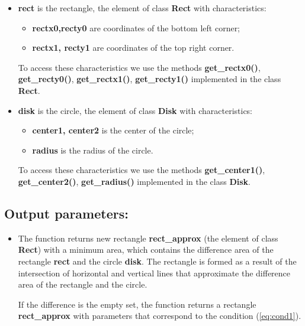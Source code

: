 \documentclass{report}
\begin{document}
\begin{itemize}
	\item {\bfseries	rect} is the rectangle, the element of class {\bfseries Rect} with characteristics:
	\begin{itemize}
		\item {\bfseries rectx0,recty0} are coordinates of the bottom left corner;
		\item {\bfseries rectx1, recty1} are coordinates of the top right corner.
	\end{itemize}
	
	To access these characteristics we use the methods  {\bfseries get\_rectx0()}, {\bfseries get\_recty0()}, {\bfseries get\_rectx1()}, {\bfseries get\_recty1()} implemented in the class {\bfseries Rect}.
	
	\item {\bfseries disk}  is the circle, the element of class {\bfseries Disk} with characteristics:
	\begin{itemize}
		\item {\bfseries center1, center2}  is the center of the circle;
		\item {\bfseries radius}  is  the radius of the circle.
	\end{itemize}
	
	To access these characteristics we use the methods {\bfseries get\_center1()}, {\bfseries get\_center2()}, {\bfseries get\_radius()} implemented in the class {\bfseries Disk}.
\end{itemize}

\subsection*{Output parameters:}

\begin{itemize}
	\item The function returns new rectangle {\bfseries rect\_approx} (the element of class {\bfseries Rect}) with a minimum area, which contains the difference area of the rectangle {\bfseries rect} and the circle {\bfseries disk}. The rectangle is formed as a result of the intersection of horizontal and vertical lines that approximate the difference area of the rectangle and the circle.
	
	If the difference is the empty set, the function returns a rectangle {\bfseries rect\_approx} with parameters that correspond to the condition (\ref{eq:cond1}).
	
\end{itemize}
\end{document}
